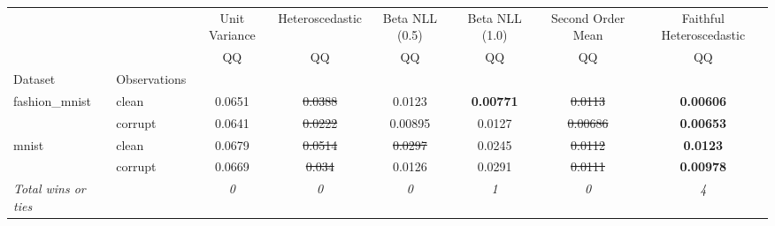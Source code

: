 \begin{tabular}{ll|c|c|c|c|c|c}
\toprule
{} & {} & {Unit Variance} & {Heteroscedastic} & {Beta NLL (0.5)} & {Beta NLL (1.0)} & {Second Order Mean} & {Faithful Heteroscedastic} \\
{} & {} & {QQ} & {QQ} & {QQ} & {QQ} & {QQ} & {QQ} \\
{Dataset} & {Observations} & {} & {} & {} & {} & {} & {} \\
\midrule
\multirow[t]{2}{*}{fashion_mnist} & clean & 0.0651 & \sout{0.0388} & 0.0123 & \textbf{0.00771} & \sout{0.0113} & \textbf{0.00606} \\
 & corrupt & 0.0641 & \sout{0.0222} & 0.00895 & 0.0127 & \sout{0.00686} & \textbf{0.00653} \\
\multirow[t]{2}{*}{mnist} & clean & 0.0679 & \sout{0.0514} & \sout{0.0297} & 0.0245 & \sout{0.0112} & \textbf{0.0123} \\
 & corrupt & 0.0669 & \sout{0.034} & 0.0126 & 0.0291 & \sout{0.0111} & \textbf{0.00978} \\
\textit{{Total wins or ties}} &  & \textit{0} & \textit{0} & \textit{0} & \textit{1} & \textit{0} & \textit{4} \\
\bottomrule
\end{tabular}
